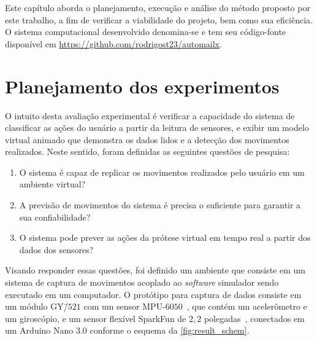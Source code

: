 Este capítulo aborda o planejamento, execução e análise do método proposto por este trabalho, a fim de verificar a viabilidade do projeto, bem como sua eficiência. O sistema computacional desenvolvido denomina-se \productname{} e tem seu código-fonte disponível em \url{https://github.com/rodrigost23/automailx}.

%
\section{Planejamento dos experimentos}\label{sec:result_planejamento}
%

O intuito desta avaliação experimental é verificar a capacidade do sistema \productname{} de classificar as ações do usuário a partir da leitura de sensores, e exibir um modelo virtual animado que demonstra os dados lidos e a detecção dos movimentos realizados. Neste sentido, foram definidas as seguintes questões de pesquisa:

\begin{enumerate}[label=\textbf{QP\arabic*:}, ref=QP\arabic*]
	\item O sistema \productname{} é capaz de replicar os movimentos realizados pelo usuário em um ambiente virtual?\label{qp:simula_movimentos}
	\item A previsão de movimentos do sistema \productname{} é precisa o suficiente para garantir a sua confiabilidade?\label{qp:acuracia}
	\item O sistema \productname{} pode prever as ações da prótese virtual em tempo real a partir dos dados dos sensores?\label{qp:previsao_sensores}
\end{enumerate}

Visando responder essas questões, foi definido um ambiente que consiste em um sistema de captura de movimentos acoplado ao \textit{software} simulador sendo executado em um computador.
% 
% 
O protótipo para captura de dados consiste em um módulo GY\=/\(521\) com um sensor MPU-\(6050\)~\cite{invensense:imu_mpu}, que contém um acelerômetro e um giroscópio, e um sensor flexível SparkFun de \(2{,}2\) polegadas~\cite{flex:datasheet}, conectados em um Arduino Nano 3.0 conforme o esquema da \autoref{fig:result_schem}.


